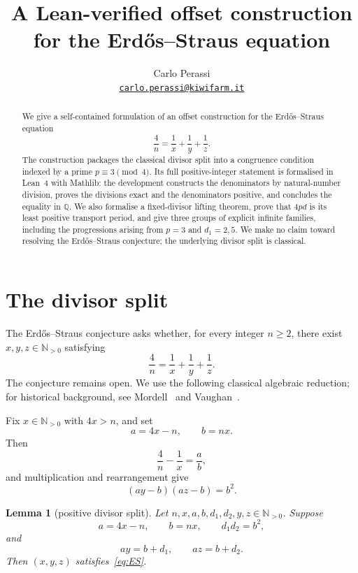 \documentclass[11pt]{article}
\title{A Lean-verified offset construction\\
for the Erdős--Straus equation}
\author{Carlo Perassi\\
\href{mailto:carlo.perassi@kiwifarm.it}{\texttt{carlo.perassi@kiwifarm.it}}}
\date{}
\newtheorem{lemma}[theorem]{Lemma}
\theoremstyle{remark}
\newcommand{\N}{\mathbb{N}}
\newcommand{\Q}{\mathbb{Q}}
\begin{document}
\maketitle

\begin{abstract}
We give a self-contained formulation of an offset construction for the
Erdős--Straus equation
\[
  \frac4n=\frac1x+\frac1y+\frac1z.
\]
The construction packages the classical divisor split into a congruence
condition indexed by a prime \(p\equiv3\pmod4\).  Its full positive-integer
statement is formalised in Lean~4 with Mathlib: the development constructs the
denominators by natural-number division, proves the divisions exact and the
denominators positive, and concludes the equality in \(\Q\).  We also formalise
a fixed-divisor lifting theorem, prove that \(4pd\) is its least positive
transport period, and give three groups of explicit infinite families,
including the progressions arising from \(p=3\) and \(d_1=2,5\).  We make no
claim toward resolving the Erdős--Straus conjecture; the underlying divisor
split is classical.
\end{abstract}

\section{The divisor split}

The Erdős--Straus conjecture asks whether, for every integer \(n\ge2\), there
exist \(x,y,z\in\N_{>0}\) satisfying
\begin{equation}\label{eq:ES}
  \frac4n=\frac1x+\frac1y+\frac1z.
\end{equation}
The conjecture remains open.  We use the following classical algebraic
reduction; for historical background, see Mordell~\cite{Mordell} and
Vaughan~\cite{Vaughan}.

Fix \(x\in\N_{>0}\) with \(4x>n\), and set
\[
  a=4x-n,\qquad b=nx.
\]
Then
\[
  \frac4n-\frac1x=\frac ab,
\]
and multiplication and rearrangement give
\begin{equation}\label{eq:split}
  (ay-b)(az-b)=b^2.
\end{equation}

\begin{lemma}[positive divisor split]\label{lem:split}
Let \(n,x,a,b,d_1,d_2,y,z\in\N_{>0}\).  Suppose
\[
  a=4x-n,\qquad b=nx,\qquad d_1d_2=b^2,
\]
and
\[
  ay=b+d_1,\qquad az=b+d_2.
\]
Then \((x,y,z)\) satisfies~\eqref{eq:ES}.
\end{lemma}
\end{document}
